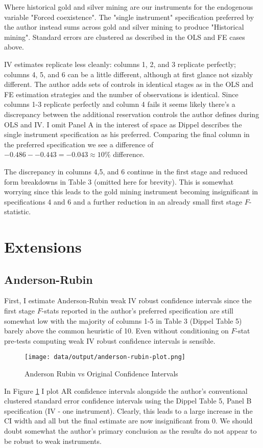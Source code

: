 \documentclass{article}
\begin{document}
Where historical gold and silver mining are our instruments for the endogenous variable "Forced coexistence". The "single instrument" specification preferred by the author instead sums across gold and silver mining to produce "Historical mining".
Standard errors are clustered as described in the OLS and FE cases above.


IV estimates replicate less cleanly: columns 1, 2, and 3 replicate perfectly; columns 4, 5, and 6 can be a little different, although at first glance not sizably different. The author 
adds sets of controls in identical stages as in the OLS and FE estimation strategies and the number of observations is identical. Since columns 1-3 
replicate perfectly and column 4 fails it seems likely there's a discrepancy between the additional reservation controls the author defines during OLS
and IV. I omit Panel A in the interest of space as Dippel describes the single instrument specification as his preferred. Comparing the final column in the preferred specification 
we see a difference of $-0.486 - - 0.443 = -0.043 \approx 10\%$ difference.

% 


 The discrepancy in columns 4,5, and 6 continue in the first stage and reduced form breakdowns in Table 3 (omitted here for brevity). This is
somewhat worrying since this leads to the gold mining instrument becoming insignificant in specifications 4 and 6 and a further reduction in an already small 
first stage $F$-statistic. 

\section{Extensions}
\subsection*{Anderson-Rubin}

First, I estimate Anderson-Rubin weak IV robust confidence intervals since the first stage $F$-stats reported in the author's preferred 
specification are still somewhat low with the majority of columns 1-5 in Table 3 (Dippel Table 5) barely above the common heuristic of 10. Even
without conditioning on $F$-stat pre-tests computing weak IV robust confidence intervals is sensible.

\begin{figure}[htbp]
    \centering
    \texttt{[image: data/output/anderson-rubin-plot.png]}
    \caption{Anderson Rubin vs Original Confidence Intervals}
    \label{AR}
\end{figure}
In Figure \ref{AR} I plot AR confidence intervals alongside the author's conventional clustered standard error confidence intervals using the Dippel Table 5, Panel B specification (IV - one instrument).
Clearly, this leads to a large increase in the CI width and all but the final estimate are now insignificant from 0. We should doubt somewhat the author's primary conclusion as the results
do not appear to be robust to weak instruments.
\end{document}
